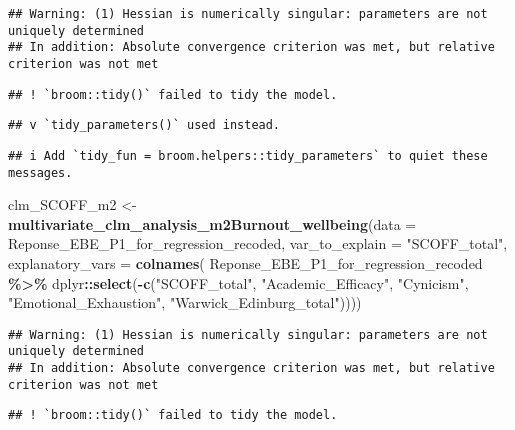 \documentclass[
]{article}
\newenvironment{Shaded}{\begin{snugshade}}{\end{snugshade}}
\newcommand{\AttributeTok}[1]{\textcolor[rgb]{0.13,0.29,0.53}{#1}}
\newcommand{\FunctionTok}[1]{\textcolor[rgb]{0.13,0.29,0.53}{\textbf{#1}}}
\newcommand{\NormalTok}[1]{#1}
\newcommand{\OtherTok}[1]{\textcolor[rgb]{0.56,0.35,0.01}{#1}}
\newcommand{\SpecialCharTok}[1]{\textcolor[rgb]{0.81,0.36,0.00}{\textbf{#1}}}
\newcommand{\StringTok}[1]{\textcolor[rgb]{0.31,0.60,0.02}{#1}}
\begin{document}
\begin{verbatim}
## Warning: (1) Hessian is numerically singular: parameters are not uniquely determined 
## In addition: Absolute convergence criterion was met, but relative criterion was not met
\end{verbatim}

\begin{verbatim}
## ! `broom::tidy()` failed to tidy the model.
\end{verbatim}

\begin{verbatim}
## v `tidy_parameters()` used instead.
\end{verbatim}

\begin{verbatim}
## i Add `tidy_fun = broom.helpers::tidy_parameters` to quiet these messages.
\end{verbatim}

\begin{Shaded}
\begin{Highlighting}[]
\NormalTok{clm\_SCOFF\_m2 }\OtherTok{\textless{}{-}}
  \FunctionTok{multivariate\_clm\_analysis\_m2Burnout\_wellbeing}\NormalTok{(}\AttributeTok{data =}\NormalTok{ Reponse\_EBE\_P1\_for\_regression\_recoded, }
                        \AttributeTok{var\_to\_explain =} \StringTok{"SCOFF\_total"}\NormalTok{, }
                        \AttributeTok{explanatory\_vars =}
                          \FunctionTok{colnames}\NormalTok{(}
\NormalTok{                            Reponse\_EBE\_P1\_for\_regression\_recoded }\SpecialCharTok{\%\textgreater{}\%}
\NormalTok{                              dplyr}\SpecialCharTok{::}\FunctionTok{select}\NormalTok{(}\SpecialCharTok{{-}}\FunctionTok{c}\NormalTok{(}\StringTok{"SCOFF\_total"}\NormalTok{, }\StringTok{"Academic\_Efficacy"}\NormalTok{, }
                                               \StringTok{"Cynicism"}\NormalTok{,}
                                   \StringTok{"Emotional\_Exhaustion"}\NormalTok{, }\StringTok{"Warwick\_Edinburg\_total"}\NormalTok{))))}
\end{Highlighting}
\end{Shaded}

\begin{verbatim}
## Warning: (1) Hessian is numerically singular: parameters are not uniquely determined 
## In addition: Absolute convergence criterion was met, but relative criterion was not met
\end{verbatim}

\begin{verbatim}
## ! `broom::tidy()` failed to tidy the model.
\end{verbatim}
\end{document}
